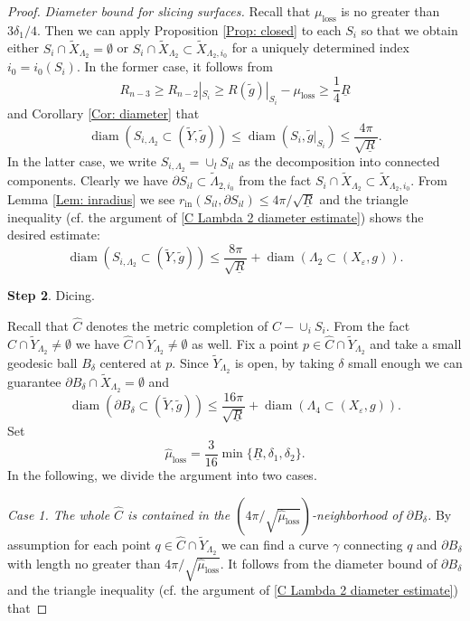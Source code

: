 \documentclass[11pt,letterpaper]{amsart}
\numberwithin{equation}{section}
\theoremstyle{definition}
\DeclareMathOperator{\diam}{diam}
\newcommand{\ve}{\varepsilon}
\newcommand{\ti}[1]{\tilde{#1}}
\begin{document}
\begin{proof}
\medskip
{\it Diameter bound for slicing surfaces.} Recall that $\mu_{\mathrm{loss}}$ is no greater than $3\delta_1/{4}$. Then we can apply Proposition \ref{Prop: closed} to each $S_i$ so that we obtain either $S_i\cap \tilde X_{\Lambda_2}=\emptyset$ or $S_i\cap \tilde X_{\Lambda_2}\subset \tilde X_{\Lambda_2,i_0}$ for a uniquely determined index $i_0=i_0(S_i)$. In the former case, it follows from
$$R_{n-3}\geq R_{n-2}|_{S_i}\geq R(\tilde g)|_{S_i}-\mu_{\mathrm{loss}}\geq \frac{1}{4}\underline R$$
and Corollary \ref{Cor: diameter} that
$$
\diam(S_{i,\Lambda_2}\subset (\tilde Y,\tilde g))\leq \diam(S_i,\ti{g}|_{S_i})\leq \frac{4\pi}{\sqrt{\underline R}}.
$$
In the latter case, we write $S_{i,\Lambda_2}=\cup_l S_{il}$ as the decomposition into connected components. Clearly we have $\partial S_{il}\subset \tilde \Lambda_{2,i_0}$ from the fact $S_i\cap \tilde X_{\Lambda_2}\subset \tilde X_{\Lambda_2,i_0}$. From Lemma \ref{Lem: inradius} we see $r_{\mathrm{in}}(S_{il},\partial S_{il})\leq 4\pi/\sqrt{\underline R}$ and the triangle inequality (cf. the argument of \eqref{C Lambda 2 diameter estimate}) shows the desired estimate:
$$
\diam(S_{i,\Lambda_2}\subset (\tilde Y,\tilde g))\leq \frac{8\pi}{\sqrt{\underline R}}+\diam(\Lambda_2\subset(X_\ve,g)).
$$



\medskip
\noindent
{\bf Step 2}. Dicing.
\medskip

Recall that $\hat C$ denotes the metric completion of $C-\cup_i S_i$. From the fact $C\cap \tilde Y_{\Lambda_2}\neq \emptyset$ we have $\hat C\cap \tilde Y_{\Lambda_2}\neq \emptyset$ as well. Fix a point $p\in \hat C\cap \tilde Y_{\Lambda_2}$ and take a small geodesic ball $B_\delta$ centered at $p$. Since $\tilde Y_{\Lambda_2}$ is open, by taking  $\delta$ small enough we can guarantee $\partial B_\delta\cap\tilde X_{\Lambda_{2}}=\emptyset$  and
$$
\diam(\partial B_{\delta}\subset (\tilde Y,\tilde g))\leq \frac{16\pi}{\sqrt{\underline R}}+\diam(\Lambda_4\subset(X_\ve,g)).
$$
Set
$$
\hat \mu_{\mathrm{loss}}=\frac{3}{16}\min\{\underline R,\delta_1,\delta_2\}.
$$
In the following, we divide the argument into two cases.

\medskip
{\it Case 1. The whole $\hat C$ is contained in the $(4\pi/\sqrt{\hat\mu_{\mathrm{loss}}})$-neighborhood of $\partial B_\delta$.} By assumption for each point $q\in \hat C\cap \tilde Y_{\Lambda_2}$ we can find a curve $\gamma$ connecting $q$ and $\partial B_\delta$ with length no greater than $4\pi/\sqrt{\hat\mu_{\mathrm{loss}}}$.
It follows from the diameter bound of $\partial B_\delta$ and  the triangle inequality (cf. the argument of \eqref{C Lambda 2 diameter estimate}) that


\end{proof}
\end{document}
